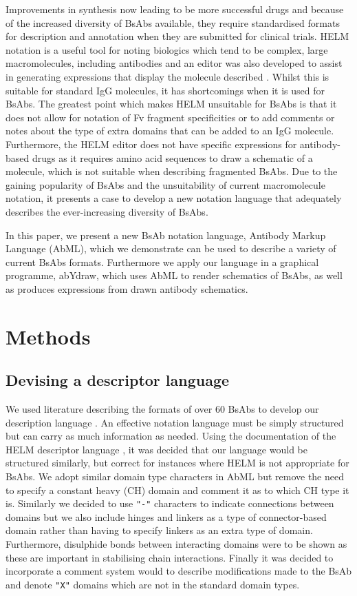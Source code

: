 \documentclass{article}
\begin{document}
Improvements in synthesis now leading to be more successful drugs and
because of the increased diversity of BsAbs available, they require
standardised formats for description and annotation when they are
submitted for clinical trials. HELM notation is a useful tool for
noting biologics which tend to be complex, large macromolecules,
including antibodies and an editor was also developed to assist in
generating expressions that display the molecule described
\cite{zhang:2012}. Whilst this is suitable for standard IgG molecules,
it has shortcomings when it is used for BsAbs. The greatest point
which makes HELM unsuitable for BsAbs is that it does not allow for
notation of Fv fragment specificities or to add comments or notes
about the type of extra domains that can be added to an IgG
molecule. Furthermore, the HELM editor does not have specific
expressions for antibody-based drugs as it requires amino acid
sequences to draw a schematic of a molecule, which is not suitable
when describing fragmented BsAbs. Due to the gaining popularity of
BsAbs and the unsuitability of current macromolecule notation, it
presents a case to develop a new notation language that adequately
describes the ever-increasing diversity of BsAbs.

In this paper, we present a new BsAb notation language, Antibody
Markup Language (AbML), which we demonstrate can be used to describe a
variety of current BsAbs formats. Furthermore we apply our language in
a graphical programme, abYdraw, which uses AbML to render schematics
of BsAbs, as well as produces expressions from drawn antibody
schematics.  

\section{Methods}

\subsection{Devising a descriptor language}
We used literature describing the formats of over 60 BsAbs to develop
our description language \cite{spiess:2015}. An effective notation
language must be simply structured but can carry as much information
as needed. Using the documentation of the HELM descriptor language
\cite{zhang:2012}, it was decided that our language would be
structured similarly, but correct for instances where HELM is not
appropriate for BsAbs. We adopt similar domain type characters in AbML
but remove the need to specify a constant heavy (CH) domain and
comment it as to which CH type it is. Similarly we decided to use \verb|"-"|
characters to indicate connections between domains but we also include
hinges and linkers as a type of connector-based domain rather than
having to specify linkers as an extra type of domain. Furthermore,
disulphide bonds between interacting domains were to be shown as these
are important in stabilising chain interactions. Finally it was
decided to incorporate a comment system would to describe
modifications made to the BsAb and denote \verb|"X"| domains which are not in
the standard domain types.  
\end{document}
